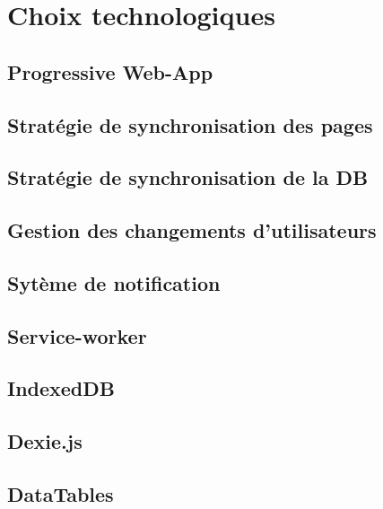 \documentclass{EPL-master-thesis-covers-FR}
\begin{document}
		\section{Choix technologiques}
			\label{sec:choix_tech}
			
			\subsection*{Progressive Web-App}
				
			\subsection{Stratégie de synchronisation des pages}			
			
			\subsection{Stratégie de synchronisation de la DB}
			
			
			\subsection{Gestion des changements d'utilisateurs}		
			
			
			\subsection{Sytème de notification}	
						

			\subsection*{Service-worker}

		
			\subsection*{IndexedDB}

					

			\subsection*{Dexie.js}
				

			\subsection*{DataTables}

			
\end{document}
